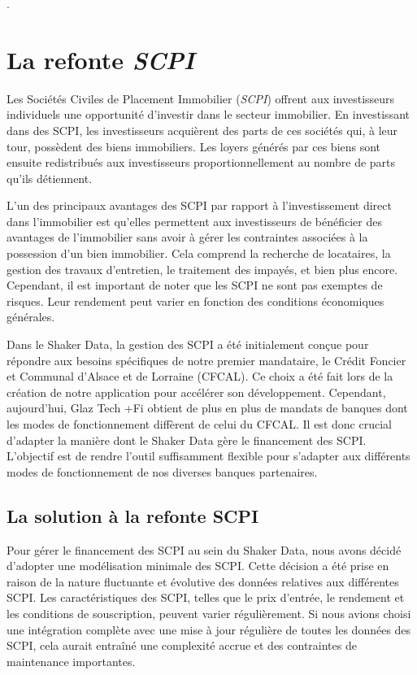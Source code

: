 \documentclass[12pt,oneside,noprintercorrection]{iut}
\begin{document}
\clearpage


.
\section{La refonte \textit{SCPI}}
Les Sociétés Civiles de Placement Immobilier (\textit{SCPI}) offrent aux investisseurs individuels une opportunité d'investir dans le secteur immobilier. En investissant dans des SCPI, les investisseurs acquièrent des parts de ces sociétés qui, à leur tour, possèdent des biens immobiliers. Les loyers générés par ces biens sont ensuite redistribués aux investisseurs proportionnellement au nombre de parts qu'ils détiennent.

L'un des principaux avantages des SCPI par rapport à l'investissement direct dans l'immobilier est qu'elles permettent aux investisseurs de bénéficier des avantages de l'immobilier sans avoir à gérer les contraintes associées à la possession d'un bien immobilier. Cela comprend la recherche de locataires, la gestion des travaux d'entretien, le traitement des impayés, et bien plus encore. Cependant, il est important de noter que les SCPI ne sont pas exemptes de risques. Leur rendement peut varier en fonction des conditions économiques générales.

Dans le Shaker Data, la gestion des SCPI a été initialement conçue pour répondre aux besoins spécifiques de notre premier mandataire, le Crédit Foncier et Communal d'Alsace et de Lorraine (CFCAL). Ce choix a été fait lors de la création de notre application pour accélérer son développement. Cependant, aujourd'hui, Glaz Tech +Fi obtient de plus en plus de mandats de banques dont les modes de fonctionnement diffèrent de celui du CFCAL. Il est donc crucial d'adapter la manière dont le Shaker Data gère le financement des SCPI. L'objectif est de rendre l'outil suffisamment flexible pour s'adapter aux différents modes de fonctionnement de nos diverses banques partenaires.

\subsection{La solution à la refonte SCPI}
Pour gérer le financement des SCPI au sein du Shaker Data, nous avons décidé d'adopter une modélisation minimale des SCPI. Cette décision a été prise en raison de la nature fluctuante et évolutive des données relatives aux différentes SCPI. Les caractéristiques des SCPI, telles que le prix d'entrée, le rendement et les conditions de souscription, peuvent varier régulièrement. Si nous avions choisi une intégration complète avec une mise à jour régulière de toutes les données des SCPI, cela aurait entraîné une complexité accrue et des contraintes de maintenance importantes.
\end{document}
